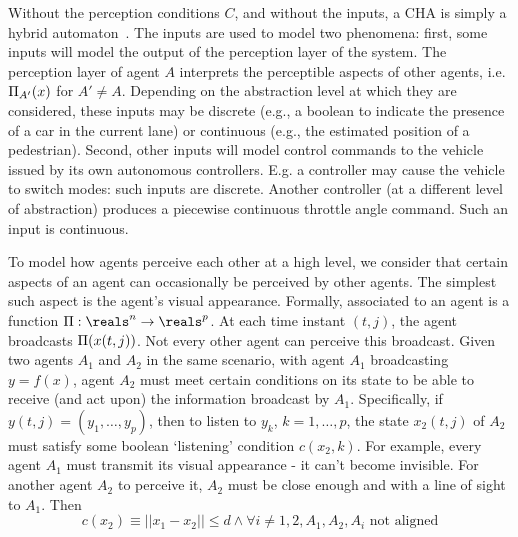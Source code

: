 	




Without the perception conditions $C$, and without the inputs, a CHA is simply a hybrid automaton~\cite{Henzinger96}.
The inputs are used to model two phenomena: 
first, some inputs will model the output of the perception layer of the system. 
The perception layer of agent $A$ interprets the perceptible aspects of other agents, i.e. $\Pi_{A'}(x)$ for $A'\neq A$.
Depending on the abstraction level at which they are considered, these inputs may be discrete (e.g., a boolean to indicate the presence of a car in the current lane) or continuous (e.g., the estimated position of a pedestrian).
Second, other inputs will model control commands to the vehicle issued by its own autonomous controllers. 
E.g. a controller may cause the vehicle to switch modes: such inputs are discrete. 
Another controller (at a different level of abstraction) produces a piecewise continuous throttle angle command. Such an input is continuous. 

To model how agents perceive each other at a high level, we consider that certain aspects of an agent can occasionally be perceived by other agents.
The simplest such aspect is the agent's visual appearance.
Formally, associated to an agent is a function $\funcOut:\reals^n \rightarrow \reals^p$.
At each time instant $(t,j)$, the agent broadcasts $\Pi(x(t,j))$.
Not every other agent can perceive this broadcast.
Given two agents $A_1$ and $A_2$ in the same scenario, with agent $A_1$ broadcasting $y = f(x)$, agent $A_2$ must meet certain conditions on its state to be able to receive (and act upon) the information broadcast by $A_1$.
Specifically, if $y(t,j) = (y_1,\ldots,y_p)$, then to listen to $y_k$, $k=1,\ldots,p$, the state $x_2(t,j)$ of $A_2$ must satisfy some boolean `listening' condition $c(x_2,k)$.
For example, every agent $A_1$ must transmit its visual appearance - it can't become invisible.
For another agent $A_2$ to perceive it, $A_2$ must be close enough and with a line of sight to $A_1$. 
Then 
\[c(x_2) \equiv ||x_1 - x_2 || \leq d \land \forall i\neq 1,2, A_1,A_2,A_i \text{ not aligned}\]

